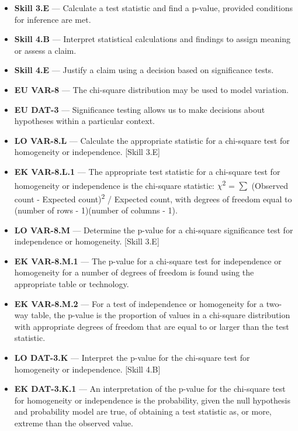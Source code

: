\documentclass[11pt]{article}
\begin{document}


{\small
\begin{itemize}[leftmargin=1.5em,itemsep=2pt,topsep=2pt]
  \item \textbf{Skill 3.E} --- Calculate a test statistic and find a p-value, provided conditions for inference are met.
  \item \textbf{Skill 4.B} --- Interpret statistical calculations and findings to assign meaning or assess a claim.
  \item \textbf{Skill 4.E} --- Justify a claim using a decision based on significance tests.
  \item \textbf{EU VAR-8} --- The chi-square distribution may be used to model variation.
  \item \textbf{EU DAT-3} --- Significance testing allows us to make decisions about hypotheses within a particular context.
  \item \textbf{LO VAR-8.L} --- Calculate the appropriate statistic for a chi-square test for homogeneity or independence. [Skill 3.E]
  \item \textbf{EK VAR-8.L.1} --- The appropriate test statistic for a chi-square test for homogeneity or independence is the chi-square statistic: $\chi$\textsuperscript{2} = $\sum$ (Observed count - Expected count)\textsuperscript{2} / Expected count, with degrees of freedom equal to (number of rows - 1)(number of columns - 1).
  \item \textbf{LO VAR-8.M} --- Determine the p-value for a chi-square significance test for independence or homogeneity. [Skill 3.E]
  \item \textbf{EK VAR-8.M.1} --- The p-value for a chi-square test for independence or homogeneity for a number of degrees of freedom is found using the appropriate table or technology.
  \item \textbf{EK VAR-8.M.2} --- For a test of independence or homogeneity for a two-way table, the p-value is the proportion of values in a chi-square distribution with appropriate degrees of freedom that are equal to or larger than the test statistic.
  \item \textbf{LO DAT-3.K} --- Interpret the p-value for the chi-square test for homogeneity or independence. [Skill 4.B]
  \item \textbf{EK DAT-3.K.1} --- An interpretation of the p-value for the chi-square test for homogeneity or independence is the probability, given the null hypothesis and probability model are true, of obtaining a test statistic as, or more, extreme than the observed value.

\end{itemize}}
\end{document}
